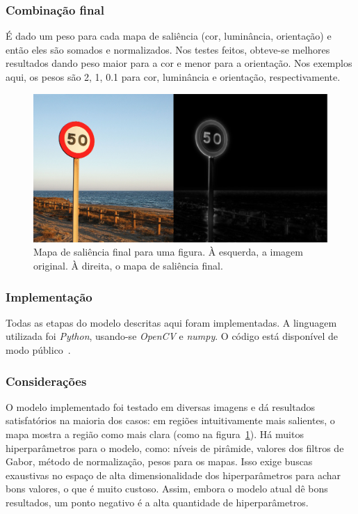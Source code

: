 \documentclass[article]{IEEEtran}
\newcommand{\tit}[1]{\textit{#1}}
\begin{document}
\subsubsection{Combinação final}
É dado um peso para cada mapa de saliência (cor, luminância, orientação)
e então eles são somados e normalizados. Nos testes feitos, obteve-se
melhores resultados dando peso maior para a cor e menor para a orientação.
Nos exemplos aqui, os pesos são 2, 1, 0.1 para cor, luminância e orientação,
respectivamente.
\begin{figure}[H]
\begin{center}
        \includegraphics[width=0.6\linewidth]{img/att.png}
\end{center}
\caption{Mapa de saliência final para uma figura. À esquerda, a imagem
    original. À direita, o mapa de saliência final.}
\label{fig:att}
\end{figure}

\subsubsection{Implementação}
Todas as etapas do modelo descritas aqui foram implementadas.
A linguagem utilizada foi \tit{Python}, usando-se \tit{OpenCV} e \tit{numpy}.
O código está disponível de modo público~\cite{att}.

\subsubsection{Considerações}
O modelo implementado foi testado em diversas imagens e dá resultados
satisfatórios na maioria dos casos: em regiões intuitivamente mais salientes,
o mapa mostra a região como mais clara (como na figura~\ref{fig:att}).
Há muitos hiperparâmetros para o modelo, como: níveis de pirâmide,
valores dos filtros de Gabor, método de normalização, pesos para os mapas.
Isso exige buscas exaustivas no espaço de alta dimensionalidade dos
hiperparâmetros para achar bons valores, o que é muito custoso.
Assim, embora o modelo atual dê bons resultados, um ponto negativo
é a alta quantidade de hiperparâmetros.
\end{document}

